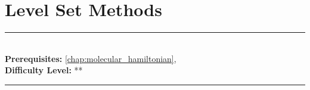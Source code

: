 \documentclass[book.tex]{subfiles}
\begin{document}
\chapter{Level Set Methods}
\label{chap:phase_field_methods}
\noindent\rule{11cm}{0.4pt} \\
\textbf{Prerequisites:} \autoref{chap:molecular_hamiltonian},  \\
\textbf{Difficulty Level:} ** \\
\noindent\rule{11cm}{0.4pt}
\vspace{5mm}
\end{document}
